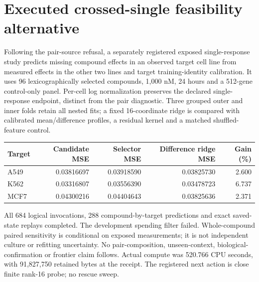 \section{Executed crossed-single feasibility alternative}
Following the pair-source refusal, a separately registered exposed single-response study predicts missing compound effects in an observed target cell line from measured effects in the other two lines and target training-identity calibration. It uses 96 lexicographically selected compounds, 1,000 nM, 24 hours and a 512-gene control-only panel. Per-cell log normalization preserves the declared single-response endpoint, distinct from the pair diagnostic. Three grouped outer and inner folds retain all nested fits; a fixed 16-coordinate ridge is compared with calibrated mean/difference profiles, a residual kernel and a matched shuffled-feature control.

\begin{center}
\begin{tabular}{lrrrr}
\toprule
Target & Candidate MSE & Selector MSE & Difference ridge MSE & Gain (\%) \\
\midrule
A549 & 0.03816697 & 0.03918590 & 0.03825730 & 2.600 \\
K562 & 0.03316807 & 0.03556390 & 0.03478723 & 6.737 \\
MCF7 & 0.04300216 & 0.04404643 & 0.03825636 & 2.371 \\
\bottomrule
\end{tabular}
\end{center}
All 684 logical invocations, 288 compound-by-target predictions and exact saved-state replays completed. The development spending filter failed. Whole-compound paired sensitivity is conditional on exposed measurements; it is not independent culture or refitting uncertainty. No pair-composition, unseen-context, biological-confirmation or frontier claim follows. Actual compute was 520.766 CPU seconds, with 91,827,750 retained bytes at the receipt. The registered next action is close finite rank-16 probe; no rescue sweep.
